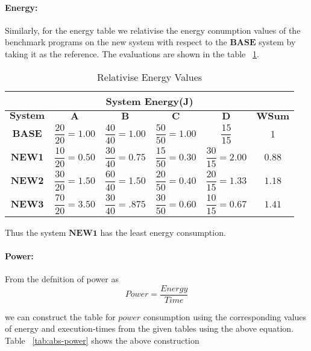 \documentclass{tufte-handout}
\begin{document}
	  \paragraph{Energy: } Similarly, for the energy table we relativise the energy conumption values of the benchmark programs on the new system with respect to the $\textbf{BASE}$ system by taking it as the reference. The evaluations are shown in the table ~\ref{tab:exec-energy}. 
	
	\begin{table}[!ht]
	    \centering
	    \selectfont
		\renewcommand{\arraystretch}{3.0}
		\label{tab:exec-energy}
	    \begin{tabular}{c|c|c|c|c|c}
	      \toprule
		  \multicolumn{6}{|c|}{System Energy(J)}  \\
	      \midrule 
		  $\textbf{System}$ & $\textbf{A}$ & $\textbf{B}$ & $\textbf{C}$ & $\textbf{D}$ & $\textbf{WSum}$ \\  %
		  $\textbf{BASE}$ & $\dfrac{20}{20}=1.00$ & $\dfrac{40}{40} = 1.00$ & $\dfrac{50}{50} = 1.00$ & $\dfrac{15}{15}$ & 1 \\ 
		  $\textbf{NEW1}$ & $\dfrac{10}{20}=0.50$ & $\dfrac{30}{40} = 0.75$ & $\dfrac{15}{50} = 0.30$ & $\dfrac{30}{15} = 2.00$ & $0.88$ \\ 
		  $\textbf{NEW2}$ & $\dfrac{30}{20}=1.50$ & $\dfrac{60}{40} = 1.50$ & $\dfrac{20}{50} = 0.40$ & $\dfrac{20}{15} = 1.33$ & $1.18$ \\ 
		  $\textbf{NEW3}$ & $\dfrac{70}{20}=3.50$ & $\dfrac{30}{40} = .875$ & $\dfrac{30}{50} = 0.60$ & $\dfrac{10}{15} = 0.67$ & $1.41$ \\
	      \bottomrule
	    \end{tabular}
	    \caption{ Relativise Energy Values }
	  \end{table}

	  Thus the system $\textbf{NEW1}$ has the least energy consumption.

	  \paragraph{Power: } From the defnition of power as
	  	\[
			Power = \dfrac{Energy}{Time} 
		\]

		we can construct the table for $power$ consumption using the corresponding values of energy and execution-times from the given tables using the above equation. Table ~\ref{tab:abs-power} shows the above construction
\end{document}
